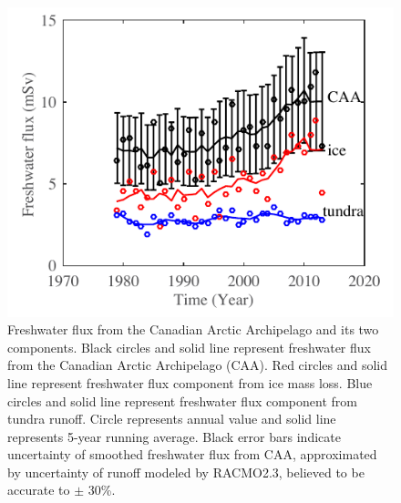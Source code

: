 \clearpage
\begin{figure}
	\centering
	\includegraphics{figs_app/FigS12.pdf}
	\caption[Freshwater flux from the Canadian Arctic Archipelago and its two components.]{Freshwater flux from the Canadian Arctic Archipelago and its two components.  Black circles and solid line represent freshwater flux from the Canadian Arctic Archipelago (CAA).  Red circles and solid line represent freshwater flux component from ice mass loss.  Blue circles and solid line represent freshwater flux component from tundra runoff.  Circle represents annual value and solid line represents 5-year running average.  Black error bars indicate uncertainty of smoothed freshwater flux from CAA, approximated by uncertainty of runoff modeled by RACMO2.3, believed to be accurate to $\pm$ 30\%\cite[]{lenaerts2013irreversible}.}
	\label{fig:SI4_fig12}
\end{figure}